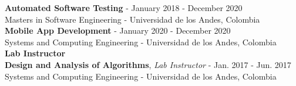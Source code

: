 \documentclass[letterpaper,11pt,oneside]{article}
\begin{document}
\indent \textbf{Automated Software Testing} - January 2018 - December 2020 \\
\indent Masters in Software Engineering - Universidad de los Andes, Colombia \\
\indent \textbf{Mobile App Development} - January 2020 - December 2020 \\
\indent Systems and Computing Engineering - Universidad de los Andes, Colombia \vspace{0.2cm}\\
\noindent \large{\textbf{Lab Instructor}}\\
\indent \textbf{Design and Analysis of Algorithms}, \textit{Lab Instructor} - Jan. 2017 - Jun. 2017 \\
\indent Systems and Computing Engineering - Universidad de los Andes, Colombia \\
\end{document}

